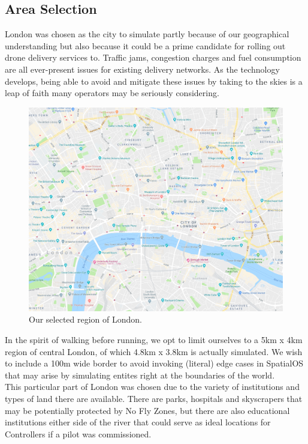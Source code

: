 \documentclass[a4paper,12pt,titlepage]{article}
\begin{document}
\subsection{Area Selection}
London was chosen as the city to simulate partly because of our geographical understanding but also because it could be a prime candidate for rolling out drone delivery services to. Traffic jams, congestion charges and fuel consumption are all ever-present issues for existing delivery networks. As the technology develops, being able to avoid and mitigate these issues by taking to the skies is a leap of faith many operators may be seriously considering.

\begin{figure}[!hbpt]
  \center
  \includegraphics[width=0.85\linewidth]{img/london_snapshot_small.png}
  \caption{Our selected region of London. \cite{Google2018a}}
  \label{fig:london_snapshot_small}
\end{figure}

In the spirit of walking before running, we opt to limit ourselves to a 5km x 4km region of central London, of which 4.8km x 3.8km is actually simulated. We wish to include a 100m wide border to avoid invoking (literal) edge cases in SpatialOS that may arise by simulating entites right at the boundaries of the world.\\

This particular part of London was chosen due to the variety of institutions and types of land there are available. There are parks, hospitals and skyscrapers that may be potentially protected by No Fly Zones, but there are also educational institutions either side of the river that could serve as ideal locations for Controllers if a pilot was commissioned.\\
\end{document}
